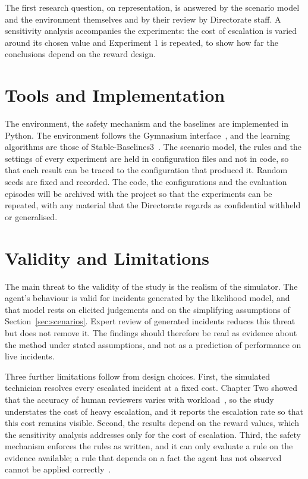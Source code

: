 \documentclass[12pt,a4paper]{article}
\begin{document}
The first research question, on representation, is answered by the scenario model and the environment themselves and by their review by Directorate staff. A sensitivity analysis accompanies the experiments: the cost of escalation is varied around its chosen value and Experiment 1 is repeated, to show how far the conclusions depend on the reward design.

\section{Tools and Implementation}

The environment, the safety mechanism and the baselines are implemented in Python. The environment follows the Gymnasium interface~\cite{towers2024}, and the learning algorithms are those of Stable-Baselines3~\cite{raffin2021}. The scenario model, the rules and the settings of every experiment are held in configuration files and not in code, so that each result can be traced to the configuration that produced it. Random seeds are fixed and recorded. The code, the configurations and the evaluation episodes will be archived with the project so that the experiments can be repeated, with any material that the Directorate regards as confidential withheld or generalised.

\section{Validity and Limitations}
\label{sec:validity}

The main threat to the validity of the study is the realism of the simulator. The agent's behaviour is valid for incidents generated by the likelihood model, and that model rests on elicited judgements and on the simplifying assumptions of Section~\ref{sec:scenarios}. Expert review of generated incidents reduces this threat but does not remove it. The findings should therefore be read as evidence about the method under stated assumptions, and not as a prediction of performance on live incidents.

Three further limitations follow from design choices. First, the simulated technician resolves every escalated incident at a fixed cost. Chapter Two showed that the accuracy of human reviewers varies with workload~\cite{zhang2026falcon,turan2026}, so the study understates the cost of heavy escalation, and it reports the escalation rate so that this cost remains visible. Second, the results depend on the reward values, which the sensitivity analysis addresses only for the cost of escalation. Third, the safety mechanism enforces the rules as written, and it can only evaluate a rule on the evidence available; a rule that depends on a fact the agent has not observed cannot be applied correctly~\cite{wu2026}.
\end{document}
